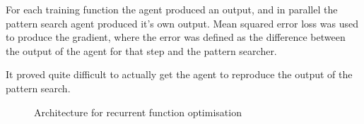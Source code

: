 For each training function the agent produced an output, and in parallel the pattern search agent produced it's own output. Mean squared error loss was used to produce the gradient, where the error was defined as the difference between the output of the agent for that step and the pattern searcher.

It proved quite difficult to actually get the agent to reproduce the output of the pattern search. %




\begin{figure}

\caption{Architecture for recurrent function optimisation}
\label{fig:RFOarch}
\end{figure}